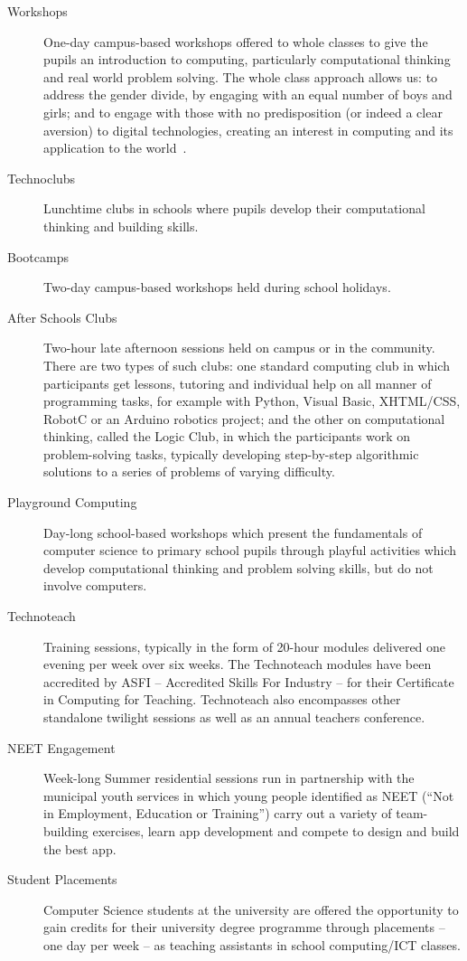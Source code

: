 \begin{description}
\item[Workshops]
One-day campus-based workshops offered to whole classes
to give the pupils an introduction to computing,
particularly computational thinking and real world problem solving.
The whole class approach allows us: to address the gender divide,
by engaging with an equal number of boys and girls;
and to engage with those with no predisposition (or indeed a clear aversion)
to digital technologies, creating an interest in computing and its
application to the world~\cite{ball-et-al:2012}.
\item[Technoclubs\footnotemark]
Lunchtime clubs in schools where pupils develop
their computational thinking and building skills.
\item[Bootcamps]
Two-day campus-based workshops held during school holidays.
\item[After Schools Clubs]
Two-hour late afternoon sessions held on campus or in the community.
There are two types of such clubs: one standard computing club
in which participants get lessons, tutoring and individual help
on all manner of programming tasks, for example with Python, Visual
Basic, XHTML/CSS,  RobotC or an Arduino robotics project;
and the other on computational thinking, called the Logic Club,
in which the participants work on problem-solving tasks,
typically developing step-by-step algorithmic solutions
to a series of problems of varying difficulty.
\item[Playground Computing\footnotemark]
Day-long school-based workshops which present
the fundamentals of computer science to primary school pupils
through playful activities which develop computational thinking
and problem solving skills, but do not involve computers.
\item[Technoteach\footnotemark]
Training sessions, typically in the form of 20-hour modules
delivered one evening per week over six weeks.
The Technoteach modules have been accredited by ASFI
-- Accredited Skills For Industry --
for their Certificate in Computing for Teaching.
Technoteach also encompasses other standalone twilight sessions
as well as an annual teachers conference.
\item[NEET Engagement]
Week-long Summer residential sessions run in partnership with
the municipal youth services in which young people identified
as NEET (``Not in Employment, Education or Training'')
carry out a variety of team-building exercises,
learn app development and compete to design and build the best app.
\item[Student Placements]
Computer Science students at the university are offered
the opportunity to gain credits for their university degree programme through
placements -- one day per week -- as teaching assistants
in school computing/ICT classes.
\end{description}

